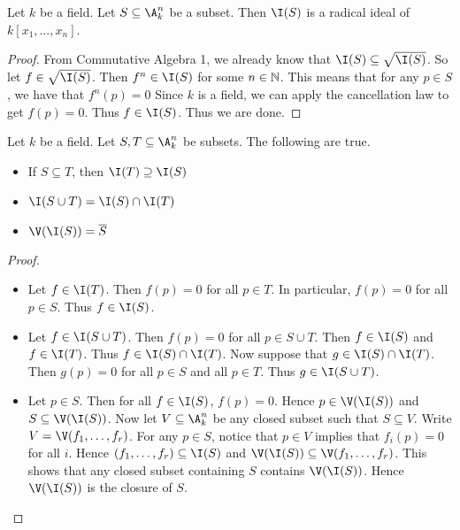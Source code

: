 \documentclass[a4paper]{article}
\begin{document}
\begin{prp}{}{} Let $k$ be a field. Let $S\subseteq\A_k^n$ be a subset. Then $\I(S)$ is a radical ideal of $k[x_1,\dots,x_n]$. 
\begin{proof}
From Commutative Algebra 1, we already know that $\I(S)\subseteq\sqrt{\I(S)}$. So let $f\in\sqrt{\I(S)}$. Then $f^n\in\I(S)$ for some $n\in\mathbb{N}$. This means that for any $p\in S$, we have that $f^n(p)=0$ Since $k$ is a field, we can apply the cancellation law to get $f(p)=0$. Thus $f\in\I(S)$. Thus we are done. 
\end{proof}
\end{prp}

\begin{prp}{}{} Let $k$ be a field. Let $S,T\subseteq\A_k^n$ be subsets. The following are true. 
\begin{itemize}
\item If $S\subseteq T$, then $\I(T)\supseteq\I(S)$
\item $\I(S\cup T)=\I(S)\cap\I(T)$
\item $\V(\I(S))=\overline{S}$
\end{itemize} 
\begin{proof}~\\
\begin{itemize}
\item Let $f\in\I(T)$. Then $f(p)=0$ for all $p\in T$. In particular, $f(p)=0$ for all $p\in S$. Thus $f\in\I(S)$. 
\item Let $f\in\I(S\cup T)$. Then $f(p)=0$ for all $p\in S\cup T$. Then $f\in\I(S)$ and $f\in\I(T)$. Thus $f\in\I(S)\cap\I(T)$. Now suppose that $g\in\I(S)\cap\I(T)$. Then $g(p)=0$ for all $p\in S$ and all $p\in T$. Thus $g\in\I(S\cup T)$. 
\item Let $p\in S$. Then for all $f\in\I(S)$, $f(p)=0$. Hence $p\in\V(\I(S))$ and $S\subseteq\V(\I(S))$. Now let $V\subseteq\A_k^n$ be any closed subset such that $S\subseteq V$. Write $V=\V(f_1,\dots,f_r)$. For any $p\in S$, notice that $p\in V$ implies that $f_i(p)=0$ for all $i$. Hence $(f_1,\dots,f_r)\subseteq\I(S)$ and $\V(\I(S))\subseteq\V(f_1,\dots,f_r)$. This shows that any closed subset containing $S$ contains $\V(\I(S))$. Hence $\V(\I(S))$ is the closure of $S$. 
\end{itemize}
\end{proof}
\end{prp}
\end{document}
